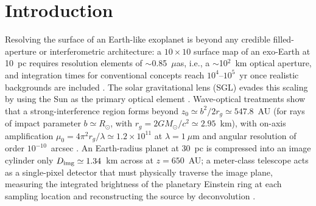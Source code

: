 \documentclass[twocolumn]{emulateapj}
\begin{document}
\begin{abstract}
slot deflation supplies the primary gain ($\Delta r=+0.041$, $p<10^{-3}$),
removing disk-integrated cloud modes. Reconstruction requires spin-axis pole
orientation to $\lesssim5^\circ$, initial phase to $\lesssim5^\circ$, and
period to $\sim10^{-4}$, refinable in-flight via profile likelihood. Surface
correlation $r(\ell)$ resolves spherical harmonic features to $\ell\approx20$,
and a land--ocean dichotomy separation metric yields $d'=0.64$ vs.\ spatial
surrogate nulls ($p<0.02$). Finally, we map requirements onto missions: we
rank the five nearest confirmed potentially habitable planets with propagated
physical uncertainties, evaluate image-plane dynamics
(0.1--5.8~km\,s$^{-1}$ per 90~d), discuss deep-perihelion sailcraft
($\sigma_{\rm tot}\simeq2.3$--4.9~g\,m$^{-2}$), planar radioisotope tiles, and
optical relays, and reframe multi-spacecraft swarms as an asymptotic
architectural scenario.
\end{abstract}


\section{Introduction}
\label{sec:intro}

Resolving the surface of an Earth-like exoplanet is beyond any credible
filled-aperture or interferometric architecture: a $10\times10$ surface
map of an exo-Earth at 10~pc requires resolution elements of
$\sim$0.85~$\mu$as, i.e., a $\sim$10$^2$~km optical aperture, and
integration times for conventional concepts reach $10^4$--$10^5$~yr once
realistic backgrounds are included \citep{tur26direct}. The solar
gravitational lens (SGL) evades this scaling by using the Sun as the
primary optical element \citep{eshleman79,tt17}. Wave-optical treatments
show that a strong-interference region forms beyond
$z_0\simeq b^2/2r_g\simeq547.8$~AU (for rays of impact parameter
$b\simeq R_\odot$, with $r_g=2GM_\odot/c^2\simeq2.95$~km), with on-axis
amplification $\mu_0=4\pi^2 r_g/\lambda\simeq1.2\times10^{11}$ at
$\lambda=1~\mu$m and angular resolution of order $10^{-10}$~arcsec
\citep{tt17,tt19}. An Earth-radius planet at 30~pc is compressed into an
image cylinder only $D_{\rm img}\simeq1.34$~km across at $z=650$~AU; a
meter-class telescope acts as a single-pixel detector that must
physically traverse the image plane, measuring the integrated brightness
of the planetary Einstein ring at each sampling location and
reconstructing the source by deconvolution
\citep{tt20psf,toth21,tt22mnras}.
\end{document}
